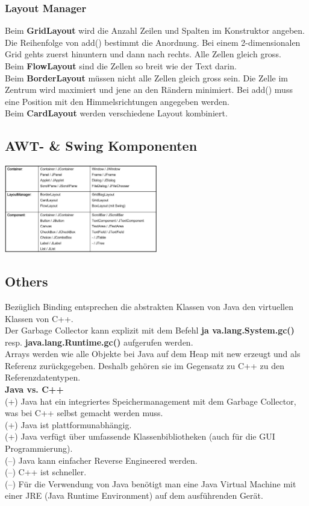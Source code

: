 \subsubsection{Layout Manager}

Beim \textbf{GridLayout} wird die Anzahl Zeilen und Spalten im Konstruktor angeben. Die Reihenfolge von add() bestimmt die Anordnung. Bei einem 2-dimensionalen Grid gehts zuerst hinuntern und dann nach rechts. Alle Zellen gleich gross.\\
Beim \textbf{FlowLayout} sind die Zellen so breit wie der Text darin. \\
Beim \textbf{BorderLayout} müssen nicht alle Zellen gleich gross sein. Die Zelle im Zentrum wird maximiert und jene an den Rändern minimiert. Bei add() muss eine Position mit den Himmelsrichtungen angegeben werden. \\
Beim \textbf{CardLayout} werden verschiedene Layout kombiniert. \\

\subsection{AWT- \& Swing Komponenten}
\includegraphics[width=0.50\textwidth]{Loes/Komponenten.JPG}

\subsection{Others}
Bezüglich Binding entsprechen die abstrakten Klassen von Java den virtuellen Klassen von C++. \\
Der Garbage Collector kann explizit mit dem Befehl \textbf{ja
	va.lang.System.gc() }  resp.  \textbf{java.lang.Runtime.gc()} aufgerufen werden. \\
Arrays werden wie alle Objekte bei Java auf dem Heap mit new erzeugt und als Referenz zurückgegeben. Deshalb gehören sie im Gegensatz zu C++ zu den Referenzdatentypen. \\

\textbf{Java vs. C++} \\
(+) Java hat ein integriertes Speichermanagement mit dem Garbage Collector, was bei C++ selbst gemacht werden muss.  \\
(+) Java ist plattformunabhängig.  \\
(+) Java verfügt über umfassende Klassenbibliotheken (auch für die GUI Programmierung). \\
(--) Java kann einfacher Reverse Engineered werden. \\
(--) C++ ist schneller. \\
(--) Für die Verwendung von Java benötigt man eine Java Virtual Machine mit einer JRE (Java Runtime Environment) auf dem ausführenden Gerät. 

